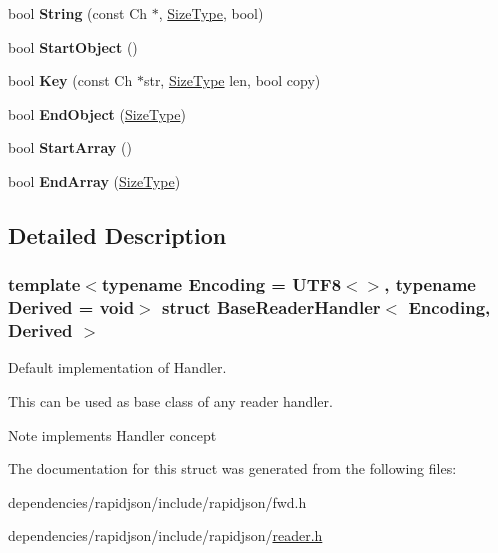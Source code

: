 \begin{DoxyCompactItemize}
\mbox{\label{struct_base_reader_handler_a3ac69e6326d0aeef7b1f2619742bbe00}} 
bool {\bfseries String} (const Ch $\ast$, \hyperlink{rapidjson_8h_a5ed6e6e67250fadbd041127e6386dcb5}{Size\+Type}, bool)
\item 
\mbox{\label{struct_base_reader_handler_ab0a7d9bcececb8d6ed748656f67f4917}} 
bool {\bfseries Start\+Object} ()
\item 
\mbox{\label{struct_base_reader_handler_abc50b2e7e411b7b731715e05cd01e2eb}} 
bool {\bfseries Key} (const Ch $\ast$str, \hyperlink{rapidjson_8h_a5ed6e6e67250fadbd041127e6386dcb5}{Size\+Type} len, bool copy)
\item 
\mbox{\label{struct_base_reader_handler_a0406cee0af26bc3a0b7fb2414537b0ab}} 
bool {\bfseries End\+Object} (\hyperlink{rapidjson_8h_a5ed6e6e67250fadbd041127e6386dcb5}{Size\+Type})
\item 
\mbox{\label{struct_base_reader_handler_a9dbb1143a250a904bb18a174553a3a00}} 
bool {\bfseries Start\+Array} ()
\item 
\mbox{\label{struct_base_reader_handler_ae9d60a8779b6a77a7f283d64961879fb}} 
bool {\bfseries End\+Array} (\hyperlink{rapidjson_8h_a5ed6e6e67250fadbd041127e6386dcb5}{Size\+Type})
\end{DoxyCompactItemize}


\subsection{Detailed Description}
\subsubsection*{template$<$typename Encoding = U\+T\+F8$<$$>$, typename Derived = void$>$\newline
struct Base\+Reader\+Handler$<$ Encoding, Derived $>$}

Default implementation of Handler. 

This can be used as base class of any reader handler. \begin{DoxyNote}{Note}
implements Handler concept 
\end{DoxyNote}


The documentation for this struct was generated from the following files\+:\begin{DoxyCompactItemize}
\item 
dependencies/rapidjson/include/rapidjson/fwd.\+h\item 
dependencies/rapidjson/include/rapidjson/\hyperlink{reader_8h}{reader.\+h}\end{DoxyCompactItemize}
